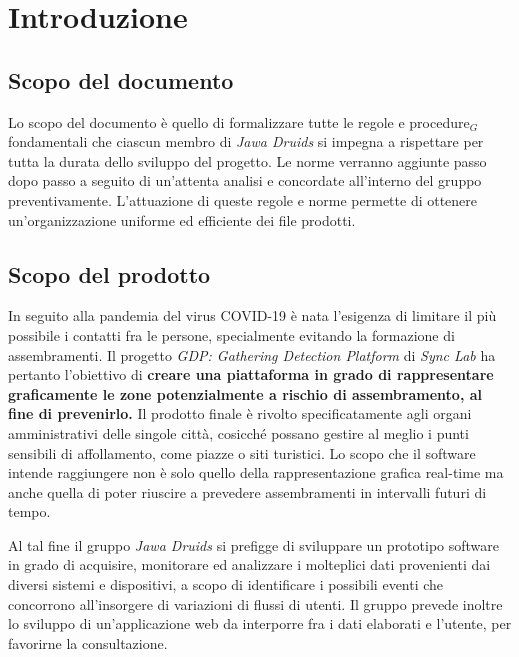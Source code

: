 \chapter{Introduzione}\label{Introduzione}

\section{Scopo del documento}\label{IntroduzioneScopoDelDocumento}
Lo scopo del documento è quello di formalizzare tutte le regole e procedure$_G$ fondamentali che ciascun membro di \textit{Jawa Druids} si impegna a rispettare per tutta la durata dello sviluppo del progetto. 
Le norme verranno aggiunte passo dopo passo a seguito di un'attenta analisi e concordate all'interno del gruppo preventivamente. L'attuazione di queste regole e norme permette di ottenere un'organizzazione uniforme ed efficiente dei file prodotti.
\section{Scopo del prodotto}\label{1.2}
In seguito alla pandemia del virus COVID-19 è nata l'esigenza di limitare il più possibile i contatti fra le persone, specialmente evitando la formazione di assembramenti. Il progetto \textit{GDP: Gathering Detection Platform} di \textit{Sync Lab} ha pertanto l'obiettivo di \textbf{creare una piattaforma in grado di rappresentare graficamente le zone potenzialmente a rischio di assembramento, al fine di prevenirlo.}
Il prodotto finale è rivolto specificatamente agli organi amministrativi delle singole città, cosicché possano gestire al meglio i punti sensibili di affollamento, come piazze o siti turistici.
Lo scopo che il software intende raggiungere non è solo quello della rappresentazione grafica real-time ma anche quella di poter riuscire a prevedere assembramenti in intervalli futuri di tempo.

Al tal fine il gruppo \textit{Jawa Druids} si prefigge di sviluppare un prototipo software in grado di acquisire, monitorare ed analizzare i molteplici dati provenienti dai diversi sistemi e dispositivi, a scopo di identificare i possibili eventi che concorrono all’insorgere di variazioni di flussi di utenti. Il gruppo prevede inoltre lo sviluppo di un'applicazione web da interporre fra i dati elaborati e l'utente, per favorirne la consultazione.
